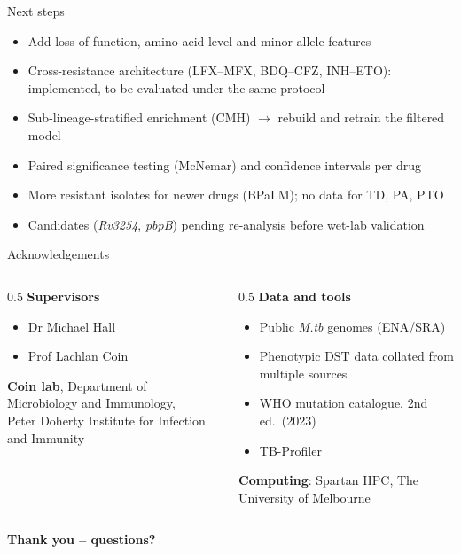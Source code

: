 \documentclass[pdf]{beamer} %
\begin{document}
\begin{frame}{Next steps}
  \begin{itemize}
    \item Add loss-of-function, amino-acid-level and minor-allele features
    \item Cross-resistance architecture (LFX--MFX, BDQ--CFZ, INH--ETO): implemented, to be evaluated under the same protocol
    \item Sub-lineage-stratified enrichment (CMH) $\rightarrow$ rebuild and retrain the filtered model
    \item Paired significance testing (McNemar) and confidence intervals per drug
    \item More resistant isolates for newer drugs (BPaLM); no data for TD, PA, PTO
    \item Candidates (\textit{Rv3254}, \textit{pbpB}) pending re-analysis before wet-lab validation
  \end{itemize}
\end{frame}


\begin{frame}{Acknowledgements}
  \begin{columns}[T]
    \begin{column}{0.5\textwidth}
      \textbf{Supervisors}
      \begin{itemize}
        \item Dr Michael Hall
        \item Prof Lachlan Coin
      \end{itemize}
      \vspace{0.5em}
      \textbf{Coin lab}, Department of Microbiology and Immunology,\\
      Peter Doherty Institute for Infection and Immunity
    \end{column}
    \begin{column}{0.5\textwidth}
      \textbf{Data and tools}
      \begin{itemize}
        \item Public \textit{M.tb} genomes (ENA/SRA)
        \item Phenotypic DST data collated from multiple sources
        \item WHO mutation catalogue, 2nd ed.\ (2023)
        \item TB-Profiler
      \end{itemize}
      \vspace{0.5em}
      \textbf{Computing}: Spartan HPC, The University of Melbourne
    \end{column}
  \end{columns}
  \vfill
  \begin{center}
    {\Large \textbf{Thank you -- questions?}}
  \end{center}
\end{frame}
\end{document}
